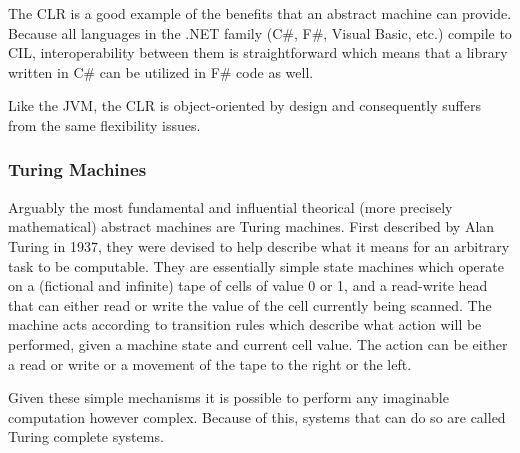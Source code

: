 The CLR is a good example of the benefits that an abstract machine can
provide. Because all languages in the .NET family (C\#, F\#, Visual Basic, etc.)
compile to CIL, interoperability between them is straightforward which means
that a library written in C\# can be utilized in F\# code as well.

Like the JVM, the CLR is object-oriented by design and consequently suffers from
the same flexibility issues.

\subsubsection{Turing Machines}

Arguably the most fundamental and influential theorical (more precisely
mathematical) abstract machines are Turing machines. First described by Alan
Turing in 1937\cite{sep-turing-machine}, they were devised to help describe what
it means for an arbitrary task to be computable. They are essentially simple
state machines which operate on a (fictional and infinite) tape of cells of
value 0 or 1, and a read-write head that can either read or write the value of
the cell currently being scanned\cite{sep-turing-machine}. The machine acts
according to transition rules which describe what action will be performed,
given a machine state and current cell value. The action can be either a read or
write or a movement of the tape to the right or the left.

Given these simple mechanisms it is possible to perform any imaginable
computation however complex. Because of this, systems that can do so are called
Turing complete systems.


